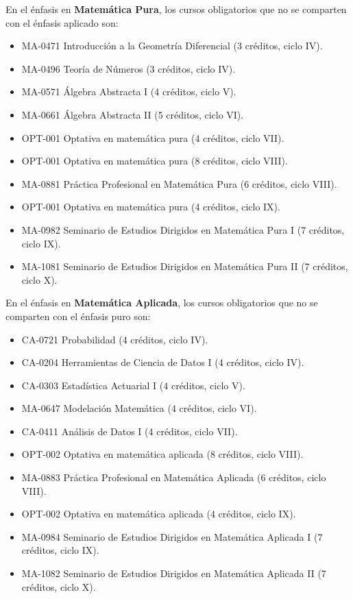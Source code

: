 \begin{refsection}
En el énfasis en \textbf{Matemática Pura}, los cursos obligatorios que no se comparten con el énfasis aplicado son:
\begin{itemize}
    \item MA-0471 Introducción a la Geometría Diferencial (3 créditos, ciclo IV).
    \item MA-0496 Teoría de Números (3 créditos, ciclo IV).
    \item MA-0571 Álgebra Abstracta I (4 créditos, ciclo V).
    \item MA-0661 Álgebra Abstracta II (5 créditos, ciclo VI).
    \item OPT-001 Optativa en matemática pura (4 créditos, ciclo VII).
    \item OPT-001 Optativa en matemática pura (8 créditos, ciclo VIII).
    \item MA-0881 Práctica Profesional en Matemática Pura (6 créditos, ciclo VIII).
    \item OPT-001 Optativa en matemática pura (4 créditos, ciclo IX).
    \item MA-0982 Seminario de Estudios Dirigidos en Matemática Pura I (7 créditos, ciclo IX).
    \item MA-1081 Seminario de Estudios Dirigidos en Matemática Pura II (7 créditos, ciclo X).
\end{itemize}

En el énfasis en \textbf{Matemática Aplicada}, los cursos obligatorios que no se comparten con el énfasis puro son:
\begin{itemize}
    \item CA-0721 Probabilidad (4 créditos, ciclo IV).
    \item CA-0204 Herramientas de Ciencia de Datos I (4 créditos, ciclo IV).
    \item CA-0303 Estadística Actuarial I (4 créditos, ciclo V).
    \item MA-0647 Modelación Matemática (4 créditos, ciclo VI).
    \item CA-0411 Análisis de Datos I (4 créditos, ciclo VII).
    \item OPT-002 Optativa en matemática aplicada (8 créditos, ciclo VIII).
    \item MA-0883 Práctica Profesional en Matemática Aplicada (6 créditos, ciclo VIII).
    \item OPT-002 Optativa en matemática aplicada (4 créditos, ciclo IX).
    \item MA-0984 Seminario de Estudios Dirigidos en Matemática Aplicada I (7 créditos, ciclo IX).
    \item MA-1082 Seminario de Estudios Dirigidos en Matemática Aplicada II (7 créditos, ciclo X).
\end{itemize}


\end{refsection}
